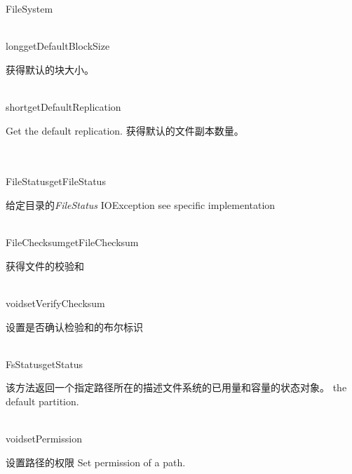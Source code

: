 \begin{XeClass}{FileSystem}
  \begin{XeMethod}{\XePublic\\ }{long}{getDefaultBlockSize}
       
 获得默认的块大小。

  \end{XeMethod}

  \begin{XeMethod}{\XePublic\\ }{short}{getDefaultReplication}
       
 Get the default replication.
 获得默认的文件副本数量。

  \end{XeMethod}

  \begin{XeMethod}{\XePublic\\ \XeAbstract\\ }{FileStatus}{getFileStatus}
       
 给定目录的\emph{FileStatus}
 IOException see specific implementation

  \end{XeMethod}

  \begin{XeMethod}{\XePublic\\ }{FileChecksum}{getFileChecksum}
       
 获得文件的校验和

  \end{XeMethod}

  \begin{XeMethod}{\XePublic\\ }{void}{setVerifyChecksum}
       
 设置是否确认检验和的布尔标识

  \end{XeMethod}

  \begin{XeMethod}{\XePublic\\ }{FsStatus}{getStatus}
       
 该方法返回一个指定路径所在的描述文件系统的已用量和容量的状态对象。
 the default partition.

  \end{XeMethod}

  \begin{XeMethod}{\XePublic\\ }{void}{setPermission}
       
 设置路径的权限
 Set permission of a path.

  \end{XeMethod}


\end{XeClass}
